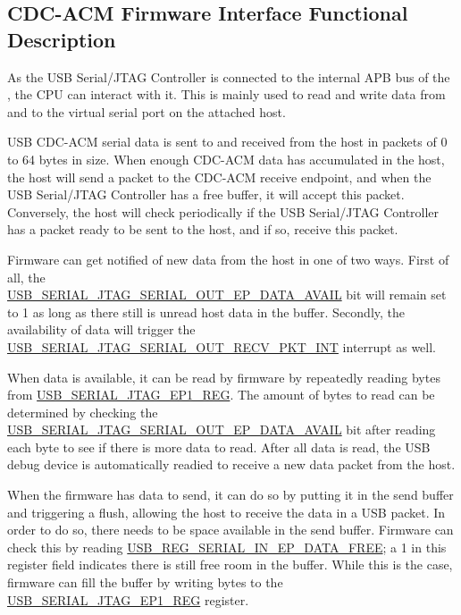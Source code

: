 \documentclass[main\_\_EN.tex]{subfiles}
\begin{document}
\subsection{CDC-ACM Firmware Interface Functional Description}

As the USB Serial/JTAG Controller is connected to the internal APB bus of the \chipname{}, the CPU can interact with it. This is mainly used to read and write data from and to the virtual serial port on the attached host.

USB CDC-ACM serial data is sent to and received from the host in packets of 0 to 64 bytes in size. When enough CDC-ACM data has accumulated in the host, the host will send a packet to the CDC-ACM receive endpoint, and when the USB Serial/JTAG Controller has a free buffer, it will accept this packet. Conversely, the host will check periodically if the USB Serial/JTAG Controller has a packet ready to be sent to the host, and if so, receive this packet.


Firmware can get notified of new data from the host in one of two ways. First of all, the\\
\hyperref[fielddesc:USBSERIALJTAGSERIALOUTEPDATAAVAIL]{USB\_SERIAL\_JTAG\_SERIAL\_OUT\_EP\_DATA\_AVAIL}  bit  will remain set to 1 as long as there still is unread host data in the buffer. Secondly, the availability of data will trigger the  \hyperref[fielddesc:USBSERIALJTAGSERIALOUTRECVPKTINTRAW]{USB\_SERIAL\_JTAG\_SERIAL\_OUT\_RECV\_PKT\_INT} interrupt as well.

When data is available, it can be read by firmware by repeatedly reading bytes from \hyperref[fielddesc:USBSERIALJTAGRDWRBYTE]{USB\_SERIAL\_JTAG\_EP1\_REG}. The amount of bytes to read can be determined by checking the
\hyperref[fielddesc:USBSERIALJTAGSERIALOUTEPDATAAVAIL]{USB\_SERIAL\_JTAG\_SERIAL\_OUT\_EP\_DATA\_AVAIL} bit after reading each byte to see if there is more data to read. After all data is read, the USB debug device is automatically readied to receive a new data packet from the host.

When the firmware has data to send, it can do so by putting it in the send buffer and triggering a flush, allowing the host to receive the data in a USB packet. In order to do so, there needs to be space available in the send buffer. Firmware can check this by reading  \hyperref[fielddesc:USBSERIALJTAGSERIALINEPDATAFREE]{USB\_REG\_SERIAL\_IN\_EP\_DATA\_FREE}; a 1 in this register field indicates there is still free room in the buffer. While this is the case, firmware can fill the buffer by writing bytes to the \hyperref[fielddesc:USBSERIALJTAGRDWRBYTE]{USB\_SERIAL\_JTAG\_EP1\_REG} register.
\end{document}
